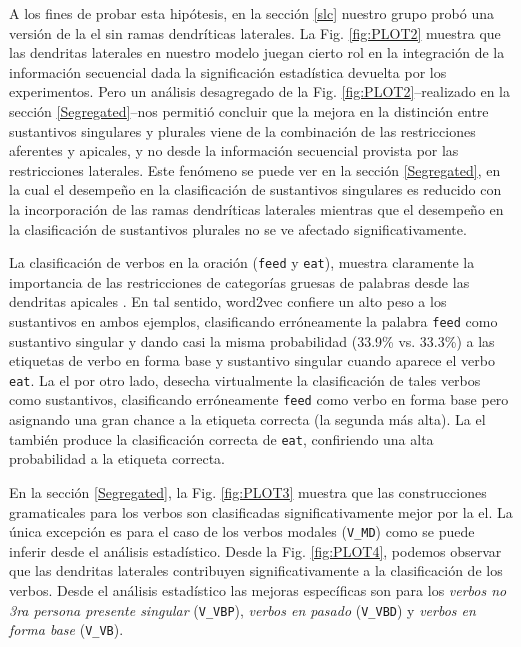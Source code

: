 {A los fines de probar esta hipótesis, en la sección \ref{slc} nuestro grupo probó una versión de la \gls{el} sin ramas dendríticas laterales.
La Fig. \ref{fig:PLOT2} muestra que las dendritas laterales en nuestro modelo juegan cierto rol en la integración de la información secuencial
dada la significación estadística devuelta por los experimentos.
Pero un análisis desagregado de la Fig. \ref{fig:PLOT2}--realizado en la sección \ref{Segregated}--nos permitió concluir que la mejora en la distinción entre sustantivos singulares y plurales viene de la combinación de las restricciones aferentes y apicales, y no desde la información secuencial provista por las restricciones laterales.
Este fenómeno se puede ver en la sección \ref{Segregated}, en la cual el desempeño en la clasificación de sustantivos singulares es reducido con la incorporación de las ramas dendríticas laterales mientras que el desempeño en la clasificación de sustantivos plurales no se ve afectado significativamente.

La clasificación de verbos en la oración (\texttt{feed} y \texttt{eat}), muestra claramente la importancia de las restricciones de categorías gruesas de palabras desde las dendritas apicales \cite{shi_newborn_1999,shi_morgan_allopenna_1998,Shi1995PerceptualCO,lohmann_phonological_2017,doi:10.1207/s15327078in1002_5}.
En tal sentido, word2vec confiere un alto peso a los sustantivos en ambos ejemplos, clasificando erróneamente la palabra \texttt{feed} como sustantivo singular y dando casi la misma probabilidad (33.9\% vs. 33.3\%) a las etiquetas de verbo en forma base y sustantivo singular cuando aparece el verbo \texttt{eat}.
La \gls{el} por otro lado, desecha virtualmente la clasificación de tales verbos como sustantivos, clasificando erróneamente \texttt{feed} como verbo en forma base pero asignando una gran chance a la etiqueta correcta (la segunda más alta).
La \gls{el} también produce la clasificación correcta de \texttt{eat}, confiriendo una alta probabilidad a la etiqueta correcta.

En la sección \ref{Segregated}, la Fig. \ref{fig:PLOT3} muestra que las construcciones gramaticales para los verbos son clasificadas significativamente mejor por la \gls{el}.
La única excepción es para el caso de los verbos modales (\texttt{V\_MD}) como se puede inferir desde el análisis estadístico.
Desde la Fig. \ref{fig:PLOT4}, podemos observar que las dendritas laterales contribuyen significativamente a la clasificación de los verbos.
Desde el análisis estadístico las mejoras específicas son para los \emph{verbos no 3ra persona presente singular} (\texttt{V\_VBP}), \emph{verbos en pasado} (\texttt{V\_VBD}) y \emph{verbos en forma base} (\texttt{V\_VB}).

}
